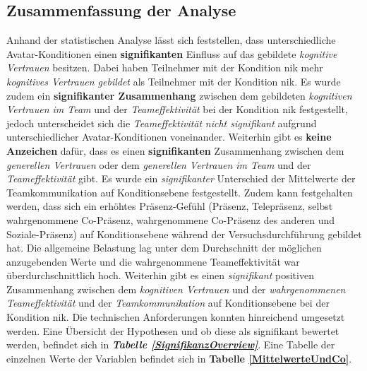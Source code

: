 \documentclass[a4paper,11pt]{article}%
\renewcommand{\\}{\vspace*{0.5\baselineskip} \newline}
\begin{document}
{{\subsection{Zusammenfassung der Analyse}
Anhand der statistischen Analyse lässt sich feststellen, dass unterschiedliche Avatar-Konditionen einen \textbf{signifikanten} Einfluss auf das gebildete \textit{kognitive Vertrauen} besitzen. Dabei haben Teilnehmer mit der Kondition \ac{nik} mehr \textit{kognitives Vertrauen gebildet} als Teilnehmer mit der Kondition \ac{nik}. Es wurde zudem ein \textbf{signifikanter Zusammenhang} zwischen dem gebildeten \textit{kognitiven Vertrauen im Team} und der \textit{Teameffektivität} bei der Kondition \ac{nik} festgestellt, jedoch unterscheidet sich die \textit{Teameffektivität} \textit{nicht signifikant} aufgrund unterschiedlicher Avatar-Konditionen voneinander.
Weiterhin gibt es \textbf{keine Anzeichen} dafür, dass es einen \textbf{signifikanten} Zusammenhang zwischen dem \textit{generellen Vertrauen} oder dem \textit{generellen Vertrauen im Team} und der \textit{Teameffektivität} gibt.
Es wurde ein \textit{signifikanter} Unterschied der Mittelwerte der Teamkommunikation auf Konditionsebene festgestellt. Zudem kann festgehalten werden, dass sich ein erhöhtes Präsenz-Gefühl (Präsenz, Telepräsenz, selbst wahrgenommene Co-Präsenz, wahrgenommene Co-Präsenz des anderen und Soziale-Präsenz) auf Konditionsebene während der Versuchsdurchführung gebildet hat. Die allgemeine Belastung lag unter dem Durchschnitt der möglichen anzugebenden Werte und die wahrgenommene Teameffektivität war überdurchschnittlich hoch.
Weiterhin gibt es einen \textit{signifikant} positiven Zusammenhang zwischen dem \textit{kognitiven Vertrauen} und der \textit{wahrgenommenen Teameffektivität} und der \textit{Teamkommunikation} auf Konditionsebene bei der Kondition \ac{nik}.
Die technischen Anforderungen konnten hinreichend umgesetzt werden.
Eine Übersicht der Hypothesen und ob diese als signifikant bewertet werden, befindet sich in \textbf{\textit{Tabelle \ref{SignifikanzOverview}}}. Eine Tabelle der einzelnen Werte der Variablen befindet sich in \textbf{Tabelle \ref{MittelwerteUndCo}}.

}}
\end{document}
